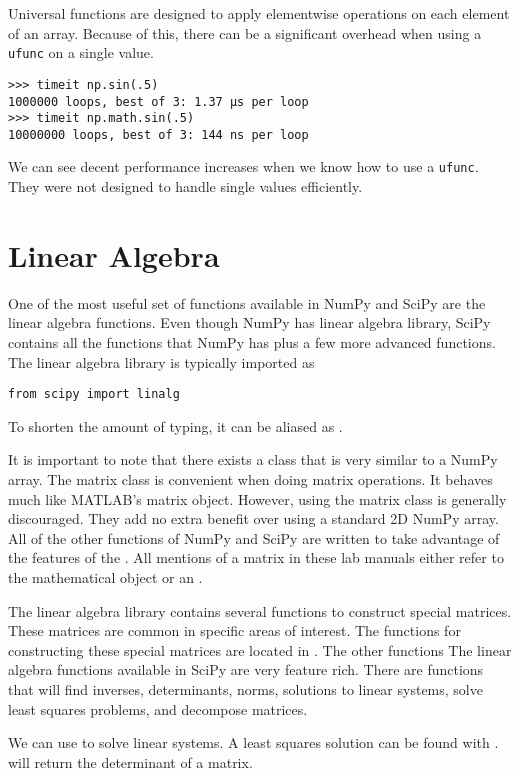 Universal functions are designed to apply elementwise operations on each element of an array.
Because of this, there can be a significant overhead when using a \texttt{ufunc} on a single value.
\begin{lstlisting}
>>> timeit np.sin(.5)
1000000 loops, best of 3: 1.37 µs per loop
>>> timeit np.math.sin(.5)
10000000 loops, best of 3: 144 ns per loop
\end{lstlisting}
We can see decent performance increases when we know how to use a \texttt{ufunc}.
They were not designed to handle single values efficiently.

\section*{Linear Algebra}
One of the most useful set of functions available in NumPy and SciPy are the linear algebra functions.
Even though NumPy has linear algebra library, SciPy contains all the functions that NumPy has plus a few more advanced functions.
The linear algebra library is typically imported as
\begin{lstlisting}
from scipy import linalg
\end{lstlisting}
To shorten the amount of typing, it can be aliased as .

It is important to note that there exists a  class that is very similar to a NumPy array.  
The matrix class is convenient when doing matrix operations. 
It behaves much like MATLAB's matrix object.
However, using the matrix class is generally discouraged.  They add no extra benefit over using a standard 2D NumPy array.
All of the other functions of NumPy and SciPy are written to take advantage of the features of the .  
All mentions of a matrix in these lab manuals either refer to the mathematical object or an .

The linear algebra library contains several functions to construct special matrices.
These matrices are common in specific areas of interest.  
The functions for constructing these special matrices are located in .
The other functions 
The linear algebra functions available in SciPy are very feature rich.
There are functions that will find inverses, determinants, norms, solutions to linear systems, solve least squares problems, and decompose matrices.

We can use  to solve linear systems.  A least squares solution can be found with .
 will return the determinant of a matrix.

